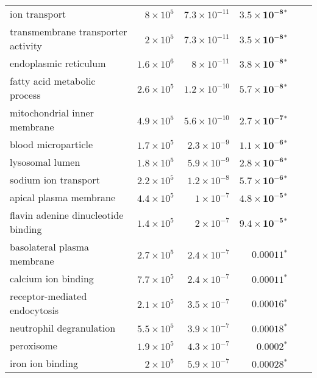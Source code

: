 \begin{longtable*}{|l|r|r|r|r|r|}
    ion transport                             & $ 8\times 10^{5}$  & $7.3\times 10^{-11}$ & $\bm{3.5\times 10^{-8}{^*}}$    \\
    transmembrane transporter activity        & $ 2\times 10^{5}$  & $7.3\times 10^{-11}$ & $\bm{3.5\times 10^{-8}{^*}}$    \\
    endoplasmic reticulum                     & $1.6\times 10^{6}$ & $ 8\times 10^{-11}$  & $\bm{3.8\times 10^{-8}{^*}}$    \\
    fatty acid metabolic process              & $2.6\times 10^{5}$ & $1.2\times 10^{-10}$ & $\bm{5.7\times 10^{-8}{^*}}$    \\
    mitochondrial inner membrane              & $4.9\times 10^{5}$ & $5.6\times 10^{-10}$ & $\bm{2.7\times 10^{-7}{^*}}$    \\
    blood microparticle                       & $1.7\times 10^{5}$ & $2.3\times 10^{-9}$  & $\bm{1.1\times 10^{-6}{^*}}$    \\
    lysosomal lumen                           & $1.8\times 10^{5}$ & $5.9\times 10^{-9}$  & $\bm{2.8\times 10^{-6}{^*}}$    \\
    sodium ion transport                      & $2.2\times 10^{5}$ & $1.2\times 10^{-8}$  & $\bm{5.7\times 10^{-6}{^*}}$    \\
    apical plasma membrane                    & $4.4\times 10^{5}$ & $ 1\times 10^{-7}$   & $\bm{4.8\times 10^{-5}{^*}}$    \\
    flavin adenine dinucleotide binding       & $1.4\times 10^{5}$ & $ 2\times 10^{-7}$   & $\bm{9.4\times 10^{-5}{^*}}$    \\
    basolateral plasma membrane               & $2.7\times 10^{5}$ & $2.4\times 10^{-7}$  & $\bm{0.00011{^*}}$              \\
    calcium ion binding                       & $7.7\times 10^{5}$ & $2.4\times 10^{-7}$  & $\bm{0.00011{^*}}$              \\
    receptor-mediated endocytosis             & $2.1\times 10^{5}$ & $3.5\times 10^{-7}$  & $\bm{0.00016{^*}}$              \\
    neutrophil degranulation                  & $5.5\times 10^{5}$ & $3.9\times 10^{-7}$  & $\bm{0.00018{^*}}$              \\
    peroxisome                                & $1.9\times 10^{5}$ & $4.3\times 10^{-7}$  & $\bm{0.0002{^*}}$               \\
    iron ion binding                          & $ 2\times 10^{5}$  & $5.9\times 10^{-7}$  & $\bm{0.00028{^*}}$              \\

\end{longtable*}
